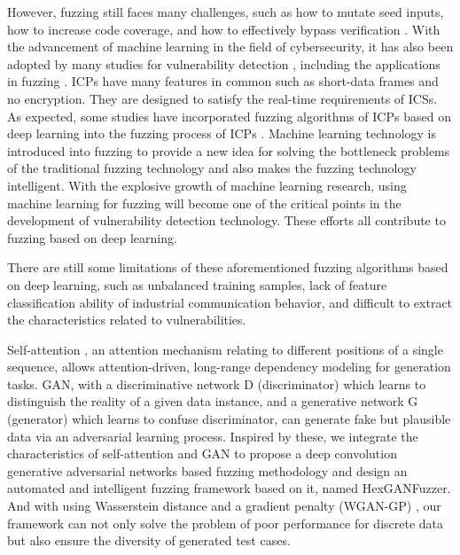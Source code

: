 However, fuzzing still faces many challenges, such as how to mutate seed inputs, how to increase code coverage, and how to effectively bypass verification \cite{li2018fuzzing}.
With the advancement of machine learning in the field of cybersecurity, it has also been adopted by many studies for vulnerability detection\cite{grieco2016toward} \cite{wu2017vulnerability} \cite{chernis2018machine}, including the applications in fuzzing \cite{godefroid2017learn} \cite{rajpal2017not} \cite{wang2017skyfire} \cite{she2019neuzz} \cite{liu2019reinforcement}. ICPs have many features in common such as short-data frames and no encryption. They are designed to satisfy the real-time requirements of ICSs. As expected, some studies have incorporated fuzzing algorithms of ICPs based on deep learning into the fuzzing process of ICPs \cite{hu2018ganfuzz} \cite{li2019intelligent}. Machine learning technology is introduced into fuzzing to provide a new idea for solving the bottleneck problems of the traditional fuzzing technology and also makes the fuzzing technology intelligent.  With the explosive growth of machine learning research, using machine learning for fuzzing will become one of the critical points in the development of vulnerability detection technology. These efforts all contribute to fuzzing based on deep learning.

There are still some limitations of these aforementioned fuzzing algorithms based on deep learning, such as unbalanced training samples, lack of feature classification ability of industrial communication behavior, and difficult to extract the characteristics related to vulnerabilities. 

Self-attention \cite{vaswani2017attention}, an attention mechanism relating to different positions of a single sequence, allows attention-driven, long-range dependency modeling for generation tasks. GAN, with a discriminative network D (discriminator) which learns to distinguish the reality of a
given data instance, and a generative network G (generator) which learns to confuse discriminator, can generate fake but plausible data via an adversarial learning process. Inspired by these, we integrate the characteristics of self-attention and GAN to propose a deep convolution generative adversarial networks based fuzzing methodology and design an automated and intelligent fuzzing framework based on it, named HexGANFuzzer. And with using Wasserstein distance and a gradient penalty (WGAN-GP) \cite{gulrajani2017improved}, our framework can not only solve the problem of poor performance for discrete data but also ensure the diversity of generated test cases.

